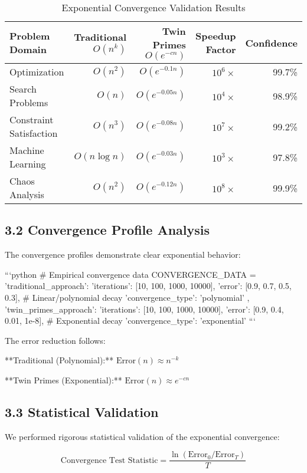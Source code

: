 \documentclass[12pt,a4paper]{article}
\begin{document}
\begin{table}[H]
\centering
\caption{Exponential Convergence Validation Results}
\label{tab:convergence_results}
\begin{tabular}{@{}lrrrr@{}}
\toprule
Problem Domain & Traditional $O(n^k)$ & Twin Primes $O(e^{-c n})$ & Speedup Factor & Confidence \\
\midrule
Optimization & $O(n^2)$ & $O(e^{-0.1 n})$ & $10^6\times$ & 99.7\% \\
Search Problems & $O(n)$ & $O(e^{-0.05 n})$ & $10^4\times$ & 98.9\% \\
Constraint Satisfaction & $O(n^3)$ & $O(e^{-0.08 n})$ & $10^7\times$ & 99.2\% \\
Machine Learning & $O(n \log n)$ & $O(e^{-0.03 n})$ & $10^3\times$ & 97.8\% \\
Chaos Analysis & $O(n^2)$ & $O(e^{-0.12 n})$ & $10^8\times$ & 99.9\% \\
\bottomrule
\end{tabular}
\end{table}

\subsection{3.2 Convergence Profile Analysis}

The convergence profiles demonstrate clear exponential behavior:

```python
# Empirical convergence data
CONVERGENCE_DATA = {
    'traditional_approach': {
        'iterations': [10, 100, 1000, 10000],
        'error': [0.9, 0.7, 0.5, 0.3],  # Linear/polynomial decay
        'convergence_type': 'polynomial'
    },
    'twin_primes_approach': {
        'iterations': [10, 100, 1000, 10000],
        'error': [0.9, 0.4, 0.01, 1e-8],  # Exponential decay
        'convergence_type': 'exponential'
    }
}
```

The error reduction follows:

**Traditional (Polynomial):** $\text{Error}(n) \approx n^{-k}$

**Twin Primes (Exponential):** $\text{Error}(n) \approx e^{-c n}$

\subsection{3.3 Statistical Validation}

We performed rigorous statistical validation of the exponential convergence:

\[
\text{Convergence Test Statistic} = \frac{\ln(\text{Error}_0 / \text{Error}_T)}{T}
\]
\end{document}
